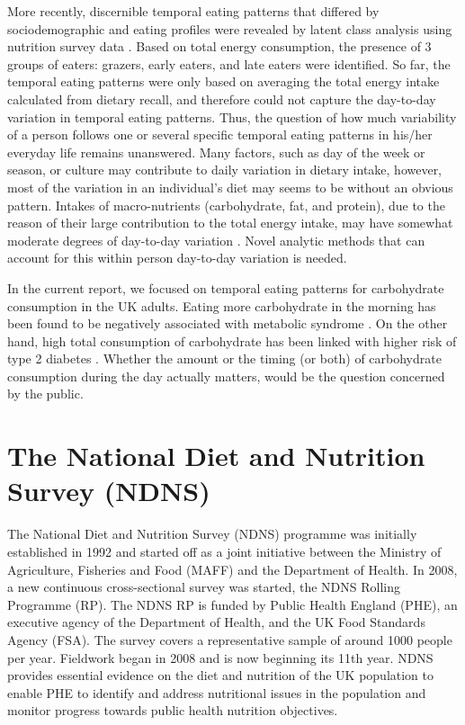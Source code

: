 More recently, discernible temporal eating patterns that differed by sociodemographic and eating profiles were revealed by latent class analysis using nutrition survey data \parencite{leech2017temporal, mansukhani2018investigating}. Based on total energy consumption, the presence of 3 groups of eaters: grazers, early eaters, and late eaters were identified. So far, the temporal eating patterns were only based on averaging the total energy intake calculated from dietary recall, and therefore could not capture the day-to-day variation in temporal eating patterns. Thus, the question of how much variability of a person follows one or several specific temporal eating patterns in his/her everyday life remains unanswered. Many factors, such as day of the week or season, or culture may contribute to daily variation in dietary intake, however, most of the variation in an individual's diet may seems to be without an obvious pattern. Intakes of macro-nutrients (carbohydrate, fat, and protein), due to the reason of their large contribution to the total energy intake, may have somewhat moderate degrees of day-to-day variation \parencite{willett2012nutritional}. Novel analytic methods that can account for this within person day-to-day variation is needed. 

In the current report, we focused on temporal eating patterns for carbohydrate consumption in the UK adults. Eating more carbohydrate in the morning has been found to be negatively associated with metabolic syndrome \parencite{almoosawi2013time}. On the other hand, high total consumption of carbohydrate has been linked with higher risk of type 2 diabetes \parencite{alhazmi2012macronutrient}. Whether the amount or the timing (or both) of carbohydrate consumption during the day actually matters, would be the question concerned by the public. 




\section{The National Diet and Nutrition Survey (NDNS)}\vspace{-0.3cm}

The National Diet and Nutrition Survey (NDNS) programme \parencite{NDNSdatabase2018} was initially established in 1992 and started off as a joint initiative between the Ministry of Agriculture, Fisheries and Food (MAFF) and the Department of Health. In 2008, a new continuous cross-sectional survey was started, the NDNS Rolling Programme (RP). The NDNS RP is funded by Public Health England (PHE), an executive agency of the Department of Health, and the UK Food Standards Agency (FSA). The survey covers a representative sample of around 1000 people per year. Fieldwork began in 2008 and is now beginning its 11th year. NDNS provides essential evidence on the diet and nutrition of the UK population to enable PHE to identify and address nutritional issues in the population and monitor progress towards public health nutrition objectives.

